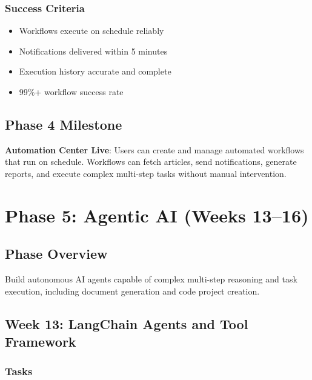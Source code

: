 \documentclass[12pt,oneside]{report}
\begin{document}
\subsubsection{Success Criteria}

\begin{itemize}
    \item Workflows execute on schedule reliably
    \item Notifications delivered within 5 minutes
    \item Execution history accurate and complete
    \item 99\%+ workflow success rate
\end{itemize}

\subsection{Phase 4 Milestone}

\textbf{Automation Center Live}: Users can create and manage automated workflows that run on schedule. Workflows can fetch articles, send notifications, generate reports, and execute complex multi-step tasks without manual intervention.

\section{Phase 5: Agentic AI (Weeks 13--16)}

\subsection{Phase Overview}

Build autonomous AI agents capable of complex multi-step reasoning and task execution, including document generation and code project creation.

\subsection{Week 13: LangChain Agents and Tool Framework}

\subsubsection{Tasks}
\end{document}

